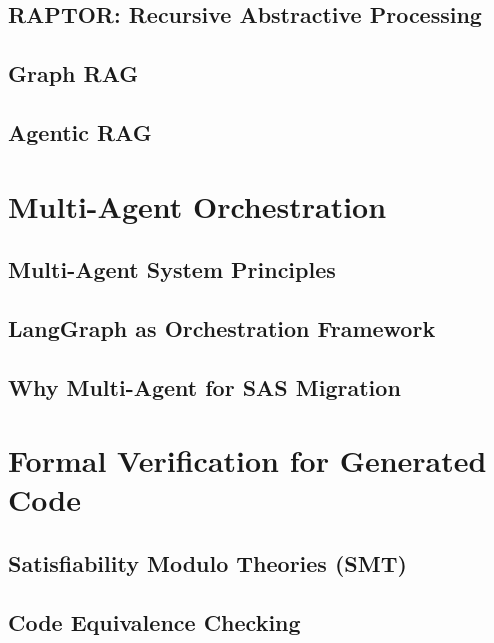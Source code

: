 \documentclass[12pt,a4paper]{report}
\begin{document}
  \subsection{RAPTOR: Recursive Abstractive Processing}
  \label{subsec:raptor-theory}

  \subsection{Graph RAG}
  \label{subsec:graph-rag-theory}

  \subsection{Agentic RAG}
  \label{subsec:agentic-rag-theory}

\section{Multi-Agent Orchestration}
\label{sec:mas-theory}

  \subsection{Multi-Agent System Principles}
  \label{subsec:mas-principles}

  \subsection{LangGraph as Orchestration Framework}
  \label{subsec:langgraph-theory}

  \subsection{Why Multi-Agent for SAS Migration}
  \label{subsec:mas-justification}

\section{Formal Verification for Generated Code}
\label{sec:formal-verification-theory}

  \subsection{Satisfiability Modulo Theories (SMT)}
  \label{subsec:smt-theory}

  \subsection{Code Equivalence Checking}
  \label{subsec:equivalence-checking}
\end{document}
